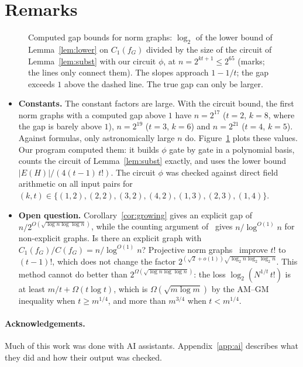 \documentclass[11pt]{article}
\theoremstyle{definition}
\theoremstyle{remark}
\newcommand{\Cone}{C_1}
\newcommand{\Csize}{C}
\begin{document}
\section{Remarks}

\begin{figure}[t]
\centering

\caption{Computed gap bounds for norm graphs: $\log_2$ of the lower bound of Lemma~\ref{lem:lower} on $\Cone(f_G)$
divided by the size of the circuit of Lemma~\ref{lem:subst} with our circuit $\phi$, at $n=2^{kt+1}\le 2^{65}$ (marks;
the lines only connect them). The slopes approach $1-1/t$; the gap exceeds $1$ above the dashed line. The true gap can
only be larger.}\label{fig:gap}
\end{figure}

\begin{itemize}
\item \textbf{Constants.} The constant factors are large. With the circuit bound, the first norm graphs with a computed
gap above $1$ have $n=2^{17}$ ($t=2$, $k=8$, where the gap is barely above $1$), $n=2^{19}$ ($t=3$, $k=6$) and
$n=2^{21}$ ($t=4$, $k=5$). Against formulas, only astronomically large $n$ do. Figure~\ref{fig:gap}
plots these values. Our program computed them: it builds $\phi$ gate by gate in a polynomial basis, counts the circuit
of Lemma~\ref{lem:subst} exactly, and uses the lower bound $|E(H)|/(4(t-1)\,t!)$. The circuit $\phi$ was checked against
direct field arithmetic on all input pairs for $(k,t)\in\{(1,2),(2,2),(3,2),(4,2),(1,3),(2,3),(1,4)\}$.
\item \textbf{Open question.} Corollary~\ref{cor:growing} gives an explicit gap of
$n/2^{O(\sqrt{\log n\log\log n})}$, while the counting argument of~\cite{Juk06} gives $n/\log^{O(1)}n$ for non-explicit
graphs. Is there an explicit graph with $\Cone(f_G)/\Csize(f_G)=n/\log^{O(1)}n$? Projective norm
graphs~\cite[Theorem~5]{ARS99} improve $t!$ to $(t-1)!$, which does not change the factor
$2^{(\sqrt2+o(1))\sqrt{\log_2 n\log_2\log_2 n}}$. This method cannot do better than $2^{\Omega(\sqrt{\log n\log\log n})}$: the loss
$\log_2(N^{1/t}\,t!)$ is at least $m/t+\Omega(t\log t)$, which is $\Omega(\sqrt{m\log m})$ by the AM--GM inequality when
$t\ge m^{1/4}$, and more than $m^{3/4}$ when $t<m^{1/4}$.
\end{itemize}

\paragraph{Acknowledgements.} Much of this work was done with AI assistants. Appendix~\ref{app:ai} describes what they
did and how their output was checked.
\end{document}
